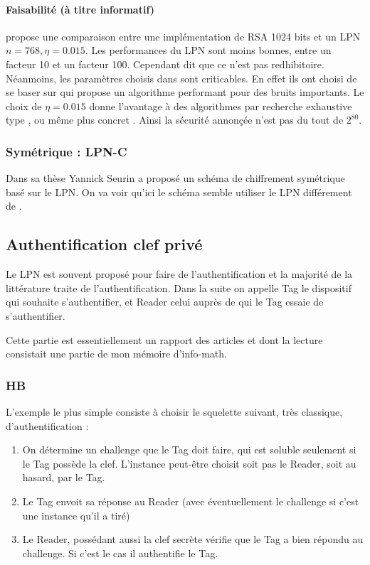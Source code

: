 \documentclass{article}		%
\theoremstyle{definition}
\theoremstyle{plain}
\theoremstyle{plain}
\theoremstyle{plain}
\theoremstyle{plain}
\theoremstyle{plain}
\begin{document}
\paragraph{Faisabilité (à titre informatif)}
\cite{Dam} propose une comparaison entre une implémentation de RSA 1024
bits et un LPN $n=768,\eta=0.015$. Les performances du LPN sont moins
bonnes, entre un facteur 10 et un facteur 100. Cependant \cite{Dam} dit
que ce n'est pas redhibitoire. Néanmoins, les paramètres choisis dans
\cite{Dam} sont criticables. En effet ils ont choisi de se baser sur
\cite{LF} qui propose un algorithme performant pour des bruits
importants. Le choix de $\eta=0.015$ donne l'avantage à des algorithmes
par recherche exhaustive type \cite{Valiant},\cite{Grigo} ou même plus
concret \cite{Gol}. Ainsi la sécurité annonçée n'est pas du tout de
$2^{80}$.

\subsubsection{Symétrique : LPN-C}

Dans sa thèse Yannick Seurin a proposé un schéma de chiffrement
symétrique basé sur le LPN. On va voir qu'ici le schéma semble utiliser
le LPN différement de \cite{Alekh}.


\subsection{Authentification clef privé}
Le LPN est souvent proposé pour faire de l'authentification et la majorité
de la littérature traite de l'authentification. Dans la suite on appelle
Tag le dispositif qui souhaite s'authentifier, et Reader celui auprès de qui le
Tag essaie de s'authentifier.

Cette partie est essentiellement un rapport des articles \cite{Lyu} et
\cite{Katz} dont la lecture consistait une partie de mon mémoire d'info-math.

\subsubsection{HB}
L'exemple le plus simple consiste à choisir le squelette suivant, très
classique, d'authentification :
\begin{enumerate}
\item On détermine un challenge que le Tag doit faire, qui est soluble
seulement si le Tag possède la clef. L'instance peut-être choisit soit
pas le Reader, soit au hasard, par le Tag.
\item Le Tag envoit sa réponse au Reader (avec éventuellement le
challenge si c'est une instance qu'il a tiré)
\item Le Reader, possédant aussi la clef secrète vérifie que le Tag a
bien répondu au challenge. Si c'est le cas il authentifie le Tag.
\end{enumerate}
\end{document}
